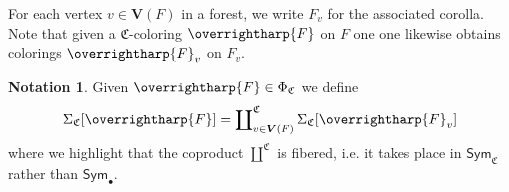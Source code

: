\documentclass[a4paper,10pt
,draft
]{article}%
\numberwithin{equation}{section}
\numberwithin{figure}{section}
\theoremstyle{definition} %
\newtheorem{notation}[equation]{Notation}%
\newcommand{\vect}[1]{\text{\overrightharp{\ensuremath{#1}}}}
\newcommand{\1}{\ensuremath{\mathbbm 1}}%
\begin{document}
For each vertex $v \in \boldsymbol{V}(F)$
in a forest, 
we write $F_v$ for the associated corolla.
Note that given a $\mathfrak{C}$-coloring $\vect{F}$ on $F$
one one likewise obtains colorings
$\vect{F}_v$ on $F_v$.



\begin{notation}
Given $\vect{F} \in \Phi_{\mathfrak{C}}$
we define
\begin{equation}\label{GENSIGC EQ}
\Sigma_{\mathfrak{C}}[\vect{F}]=
\coprod\nolimits^{\mathfrak{C}}_{v \in \boldsymbol{V}(F)} 
\Sigma_{\mathfrak{C}}[\vect{F}_v]
\end{equation}
where we highlight that the coproduct $\amalg^{\mathfrak{C}}$ is fibered, i.e. it takes place in $\mathsf{Sym}_{\mathfrak{C}}$
rather than $\mathsf{Sym}_{\bullet}$.
\end{notation}
\end{document}
